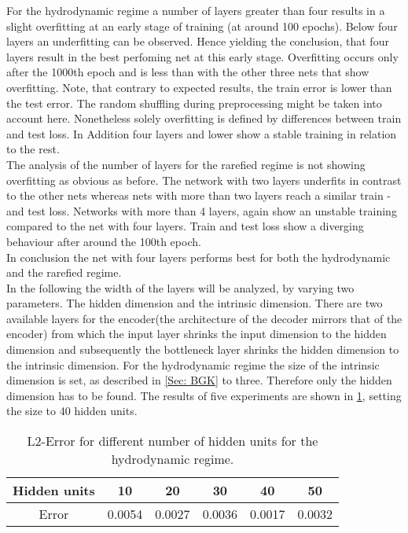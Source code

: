 For the hydrodynamic regime a number of layers greater than four results in a slight overfitting at an early stage of training (at around 100 epochs). Below four layers an underfitting can be observed. Hence yielding the conclusion, that four layers result in the best perfoming net at this early stage. Overfitting occurs only after the 1000th epoch and is less than with the other three nets that show overfitting. Note, that contrary to expected results, the train error is lower than the test error. The random shuffling during preprocessing might be taken into account here. Nonetheless solely overfitting is defined by differences between train and test loss. In Addition four layers and lower show a stable training in relation to the rest.\\
The analysis of the number of layers for the rarefied regime is not showing overfitting as obvious as before. The network with two layers underfits in contrast to the other nets whereas nets with more than two layers reach a similar train - and test loss. Networks with more than 4 layers, again show an unstable training compared to the net with four layers. Train and test loss show a diverging behaviour after around the 100th epoch.\\
In conclusion the net with four layers performs best for both the hydrodynamic and the rarefied regime.\\
In the following the width of the layers will be analyzed, by varying two parameters. The hidden dimension and the intrinsic dimension. There are two available layers for the encoder(the architecture of the decoder mirrors that of the encoder) from which the input layer shrinks the input dimension to the hidden dimension and subsequently the bottleneck layer shrinks the hidden dimension to the intrinsic dimension.
For the hydrodynamic regime the size of the intrinsic dimension is set, as described in \cref{Sec: BGK} to three. Therefore only the hidden dimension has to be found. The results of five experiments are shown in \cref{Tab:Hidden Units Hydro}, setting the size to 40 hidden units.
\begin{table}[!htbp]\centering
	\begin{tabular}{ |c|c|c|c|c|c| }
		\hline
		Hidden units & 10 & 20 & 30 & 40 & 50 \\ [.5ex]
		\hline
		Error & 0.0054 & 0.0027 & 0.0036 & 0.0017 & 0.0032\\ \hline
	\end{tabular}
	\caption{L2-Error for different number of hidden units for the hydrodynamic regime.}
	\label{Tab:Hidden Units Hydro}
\end{table}\\
